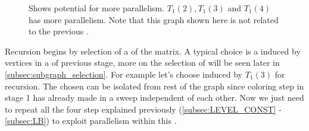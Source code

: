     \begin{figure}[thbp]
     	\centering
     	\hspace{1.5em}
     	\hspace{1.5em}
        \caption{Shows potential for more parallelism. $T_1(2),T_1(3)$ and $T_1(4)$ has more parallelism. Note that this graph shown here is not related to the previous \stex.}
     	\label{fig:rec_d1_s1}
     \end{figure}
     
     Recursion begins by selection of a \subgraph of the matrix. A typical choice is a \subgraph induced by vertices in a \levelGroup of previous stage, more on the selection of \subgraph will be seen later in \cref{subsec:subgraph_selection}. For example let's choose \subgraph induced by $T_1(3)$ for recursion. The chosen \subgraph can be isolated from rest of the graph since  \DONE coloring step in stage 1 has already made \levelGroups in a sweep independent of each other. Now we just need to repeat all the four step explained previously (\cref{subsec:LEVEL_CONST} - \cref{subsec:LB}) to exploit parallelism within this \subgraph.
   
